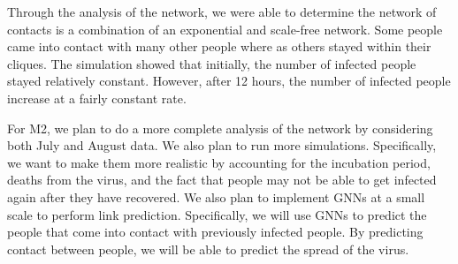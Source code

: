 \documentclass[times, 10pt,twocolumn]{article}
\begin{document}
Through the analysis of the network, we were able to determine the network of contacts is a combination of an exponential and scale-free network. Some people came into contact with many other people where as others stayed within their cliques. The simulation showed that initially, the number of infected people stayed relatively constant. However, after 12 hours, the number of infected people increase at a fairly constant rate.


For M2, we plan to do a more complete analysis of the network by considering both July and August data. We also plan to run more simulations. Specifically, we want to make them more realistic by accounting for the incubation period, deaths from the virus, and the fact that people may not be able to get infected again after they have recovered. We also plan to implement GNNs at a small scale to perform link prediction. Specifically, we will use GNNs to predict the people that come into contact with previously infected people. By predicting contact between people, we will be able to predict the spread of the virus.





\end{document}
